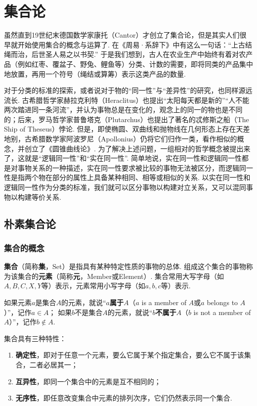 \chapter{集合论}
虽然直到19世纪末德国数学家康托（Cantor）才创立了集合论，但是其实人们很早就开始使用集合的概念与运算了.
在《周易·系辞下》中有这么一句话：“上古结绳而治，后世圣人易之以书契.”
于是我们想到，古人在农业生产中始终有着对农产品（例如红枣、覆盆子、野兔、鲤鱼等）分类、计数的需要，即将同类的产品集中地放置，再用一个符号（绳结或算筹）表示这类产品的数量.

对于分类的标准的探索，或者说对于物的“同一性”与“差异性”的研究，也同样源远流长.
古希腊哲学家赫拉克利特（Heraclitus）也提出“太阳每天都是新的”“人不能两次踏进同一条河流”，并认为事物总是在变化的，观念上的同一的物也是不同的；后来，罗马哲学家普鲁塔克（Plutarchus）也提出了著名的忒修斯之船（The Ship of Theseus）悖论.
但是，即使椭圆、双曲线和抛物线在几何形态上存在天差地别，古希腊数学家阿波罗尼（Apollonius）仍将它们归作一类，看作相似的概念，并创立了《圆锥曲线论》.
为了解决上述问题，一组相对的哲学概念被提出来了，这就是“逻辑同一性”和“实在同一性”.
简单地说，实在同一性和逻辑同一性都是对事物关系的一种描述，实在同一性要求被比较的事物无法被区分，而逻辑同一性是指两个物在部分的属性上具备某种相同、相等或相似的关系.
以实在同一性和逻辑同一性作为分类的标准，我们就可以区分事物以构建对立关系，又可以混同事物以构建等价关系.

\section{朴素集合论}
\subsection{集合的概念}
\begin{definition}
\textbf{集合}（简称\textbf{集}，Set）是指具有某种特定性质的事物的总体.
组成这个集合的事物称为该集合的\textbf{元素}（简称\textbf{元}，Member或Element）.
集合常用大写字母（如\(A,B,C,X,Y\)等）表示，元素常用小写字母（如\(a,b,c\)等）表示.

如果元素\(a\)是集合\(A\)的元素，就说“\(a\)\textbf{属于}\(A\)（\(a\) is a member of \(A\)或\(a\) belongs to \(A\)）”，记作\(a \in A\)；
如果\(b\)不是集合\(A\)的元素，就说“\(b\)\textbf{不属于}\(A\)（\(b\) is not a member of \(A\)）”，记作\(b \notin A\).
\end{definition}

\begin{property}
集合具有三种特性：\begin{enumerate}
\item \textbf{确定性}，即对于任意一个元素，要么它属于某个指定集合，要么它不属于该集合，二者必居其一；
\item \textbf{互异性}，即同一个集合中的元素是互不相同的；
\item \textbf{无序性}，即任意改变集合中元素的排列次序，它们仍然表示同一个集合.
\end{enumerate}
\end{property}

